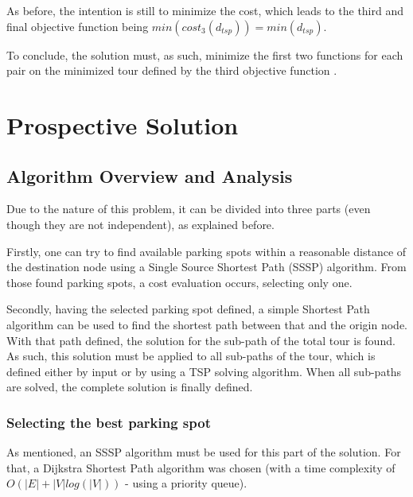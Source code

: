\documentclass[a4paper, 12pt]{report}
\begin{document}
    As before, the intention is still to minimize the cost, which leads to the third and final objective function being $min(cost_3(d_{tsp})) = min(d_{tsp})$.
    
    To conclude, the solution must, as such, minimize the first two functions for each pair on the minimized tour defined by the third objective function \footnotemark.
    
    
        
    \chapter{Prospective Solution} \label{prosol}
    
    \section{Algorithm Overview and Analysis} \label{analysis}
    
    Due to the nature of this problem, it can be divided into three parts (even though they are not independent), as explained before.
    
    Firstly, one can try to find available parking spots within a reasonable distance of the destination node using a Single Source Shortest Path (SSSP) algorithm. From those found parking spots, a cost evaluation occurs, selecting only one.
    
    Secondly, having the selected parking spot defined, a simple Shortest Path algorithm can be used to find the shortest path between that and the origin node. With that path defined, the solution for the sub-path of the total tour is found. As such, this solution must be applied to all sub-paths of the tour, which is defined either by input or by using a TSP solving algorithm. When all sub-paths are solved, the complete solution is finally defined.
    
    \subsection{Selecting the best parking spot}  \label{selectpark}
    
    As mentioned, an SSSP algorithm must be used for this part of the solution. For that, a Dijkstra Shortest Path algorithm was chosen (with a time complexity of $O(|E| + |V|log(|V|))$ - using a priority queue).
    
\end{document}
